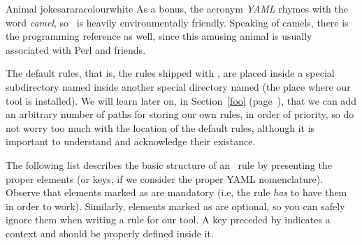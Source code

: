 \begin{messagebox}{Animal jokes}{araracolour}{\icok}{white}
As a bonus, the acronym \emph{YAML} rhymes with the word \emph{camel}, so \arara\ is heavily environmentally friendly. Speaking of camels, there is the programming reference as well, since this amusing animal is usually associated with Perl and friends.
\end{messagebox}

The default rules, that is, the rules shipped with \arara, are placed inside a special subdirectory named  inside another special directory named  (the place where our tool is installed). We will learn later on, in Section~\ref{foo} (page~\pageref{foo}), that we can add an arbitrary number of paths for storing our own rules, in order of priority, so do not worry too much with the location of the default rules, although it is important to understand and acknowledge their existance.

The following list describes the basic structure of an \arara\ rule by presenting the proper elements (or keys, if we consider the proper YAML nomenclature). Observe that elements marked as  are mandatory (i.e, the rule \emph{has} to have them in order to work). Similarly, elements marked as  are optional, so you can safely ignore them when writing a rule for our tool. A key preceded by  indicates a context and should be properly defined inside it.

